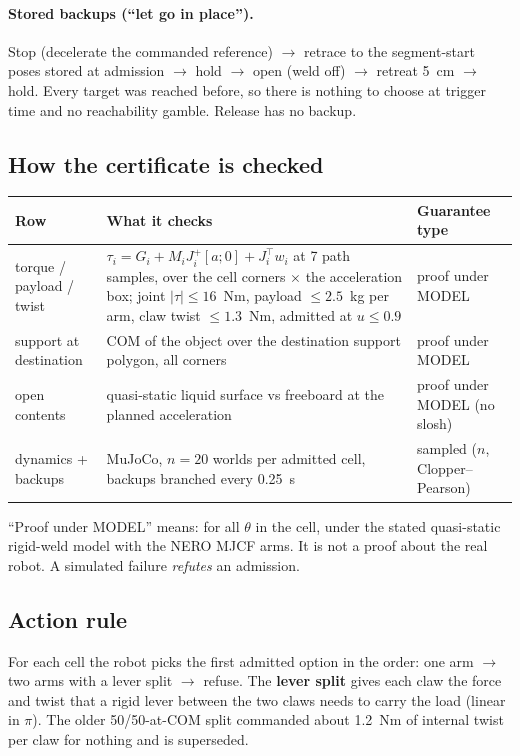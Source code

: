 \documentclass[11pt,a4paper]{article}
\begin{document}
\paragraph{Stored backups (``let go in place'').} Stop (decelerate the commanded reference) $\to$ retrace to the segment-start
poses stored at admission $\to$ hold $\to$ open (weld off) $\to$ retreat 5~cm $\to$ hold. Every target was reached before, so
there is nothing to choose at trigger time and no reachability gamble. Release has no backup.

\subsection{How the certificate is checked}
\begin{center}\small
\begin{tabularx}{\linewidth}{@{}lYl@{}}
\toprule
Row & What it checks & Guarantee type\\
\midrule
torque / payload / twist & $\tau_i = G_i + M_iJ_i^{+}[a;0] + J_i^\top w_i$ at 7 path samples, over the cell corners $\times$ the
acceleration box; joint $|\tau|\le 16$~Nm, payload $\le 2.5$~kg per arm, claw twist $\le 1.3$~Nm, admitted at $u\le 0.9$
& proof under MODEL\\
support at destination & COM of the object over the destination support polygon, all corners & proof under MODEL\\
open contents & quasi-static liquid surface vs freeboard at the planned acceleration & proof under MODEL (no slosh)\\
dynamics + backups & MuJoCo, $n=20$ worlds per admitted cell, backups branched every 0.25~s & sampled ($n$, Clopper--Pearson)\\
\bottomrule
\end{tabularx}
\end{center}
``Proof under MODEL'' means: for all $\theta$ in the cell, under the stated quasi-static rigid-weld model with the NERO MJCF arms.
It is not a proof about the real robot. A simulated failure \emph{refutes} an admission.

\subsection{Action rule}
For each cell the robot picks the first admitted option in the order: one arm $\to$ two arms with a lever split $\to$ refuse.
The \textbf{lever split} gives each claw the force and twist that a rigid lever between the two claws needs to carry the load
(linear in $\pi$). The older 50/50-at-COM split commanded about 1.2~Nm of internal twist per claw for nothing and is superseded.
\end{document}
